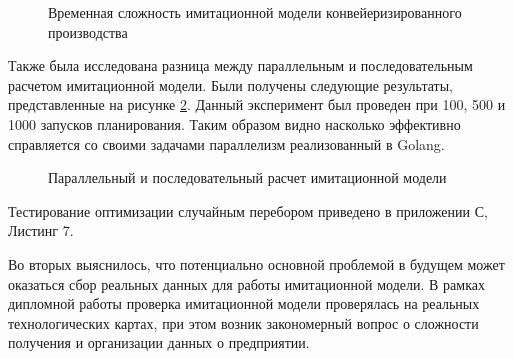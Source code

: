 \begin{figure}[H]
    \caption{Временная сложность имитационной модели конвейеризированного производства}
    \label{ris:Computational_complexity_assembly}
\end{figure}

Также была исследована разница между параллельным и последовательным расчетом имитационной модели. Были получены следующие результаты, представленные на рисунке \ref{ris:Parallellllee}. Данный эксперимент был проведен при 100, 500 и 1000 запусков планирования. Таким образом видно насколько эффективно справляется со своими задачами параллелизм реализованный в Golang.

\begin{figure}[H]
    \caption{Параллельный и последовательный расчет имитационной модели}
    \label{ris:Parallellllee}
\end{figure}

Тестирование оптимизации случайным перебором приведено в приложении С, Листинг 7.

Во вторых выяснилось, что потенциально основной проблемой в будущем может оказаться сбор реальных данных для работы имитационной модели.
В рамках дипломной работы проверка имитационной модели проверялась на реальных технологических картах, при этом возник закономерный вопрос о сложности получения и организации данных о предприятии. 

